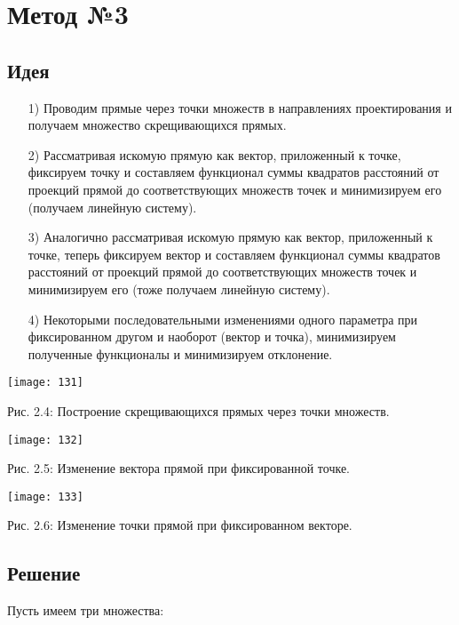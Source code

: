 \section{Метод №3}\label{meth3}

\subsection{Идея}\label{math3:idea}

\begin{itemize}
	\item[1)] Проводим прямые через точки множеств в направлениях проектирования и получаем множество скрещивающихся прямых.
	\item[2)] Рассматривая искомую прямую как вектор, приложенный к точке, фиксируем точку и составляем функционал суммы квадратов расстояний от проекций прямой до соответствующих множеств точек и минимизируем его (получаем линейную систему).
	\item[3)] Аналогично рассматривая искомую прямую как вектор, приложенный к точке, теперь фиксируем вектор и составляем функционал суммы квадратов расстояний от проекций прямой до соответствующих множеств точек и минимизируем его (тоже получаем линейную систему).
	\item[4)] Некоторыми последовательными изменениями одного параметра при фиксированном другом и наоборот (вектор и точка), минимизируем полученные функционалы и минимизируем отклонение.
\end{itemize}

\begin{center}
	\texttt{[image: 131]}

	Рис. 2.4: Построение скрещивающихся прямых через точки множеств.
\end{center}

\begin{center}
	\texttt{[image: 132]}

	Рис. 2.5: Изменение вектора прямой при фиксированной точке.

	\texttt{[image: 133]}

	Рис. 2.6: Изменение точки прямой при фиксированном векторе.
\end{center}

\subsection{Решение}\label{math3:solution}

Пусть имеем три множества:

